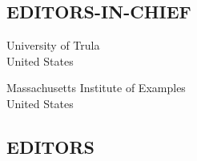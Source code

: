 
\begin{editorialboard}

\subsection{EDITORS-IN-CHIEF}

\begin{multicols}{2}\raggedcolumns
{}
                   {University of Trula \\United States}

                   {Massachusetts Institute of Examples\\United States}

\end{multicols}


\subsection{EDITORS}
\begin{multicols}{3}\raggedcolumns
{}
\end{multicols}
\end{editorialboard} 